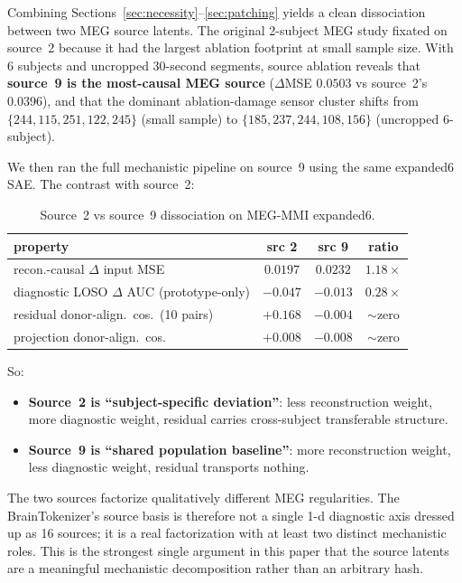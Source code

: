 \documentclass[11pt]{article}
\newcommand{\dmse}{$\Delta$ input MSE}
\newcommand{\dauc}{$\Delta$ AUC}
\begin{document}
Combining Sections~\ref{sec:necessity}--\ref{sec:patching} yields a clean
dissociation between two MEG source latents. The original 2-subject MEG study
fixated on source~2 because it had the largest ablation footprint at small
sample size. With 6 subjects and uncropped 30-second segments, source ablation
reveals that \textbf{source~9 is the most-causal MEG source}
($\Delta$MSE $0.0503$ vs source~2's $0.0396$), and that the dominant
ablation-damage sensor cluster shifts from $\{244, 115, 251, 122, 245\}$
(small sample) to $\{185, 237, 244, 108, 156\}$ (uncropped 6-subject).

We then ran the full mechanistic pipeline on source~9 using the same
expanded6 SAE. The contrast with source~2:

\begin{table}[h]
\centering
\small
\begin{tabular}{lccc}
\toprule
\textbf{property} & \textbf{src 2} & \textbf{src 9} & \textbf{ratio} \\
\midrule
recon.-causal \dmse{}                     & $0.0197$ & $0.0232$ & $1.18\times$ \\
diagnostic LOSO \dauc{} (prototype-only)  & $-0.047$ & $-0.013$ & $0.28\times$ \\
residual donor-align.\ cos.\ (10 pairs)   & $+0.168$ & $-0.004$ & $\sim$zero \\
projection donor-align.\ cos.             & $+0.008$ & $-0.008$ & $\sim$zero \\
\bottomrule
\end{tabular}
\caption{Source~2 vs source~9 dissociation on MEG-MMI expanded6.
\label{tab:dissociation}}
\end{table}

So:
\begin{itemize}
\item \textbf{Source~2 is ``subject-specific deviation''}: less reconstruction
weight, more diagnostic weight, residual carries cross-subject transferable
structure.
\item \textbf{Source~9 is ``shared population baseline''}: more reconstruction
weight, less diagnostic weight, residual transports nothing.
\end{itemize}

The two sources factorize qualitatively different MEG regularities. The
BrainTokenizer's source basis is therefore not a single 1-d diagnostic axis
dressed up as 16 sources; it is a real factorization with at least two
distinct mechanistic roles. This is the strongest single argument in this
paper that the source latents are a meaningful mechanistic decomposition rather
than an arbitrary hash.
\end{document}
